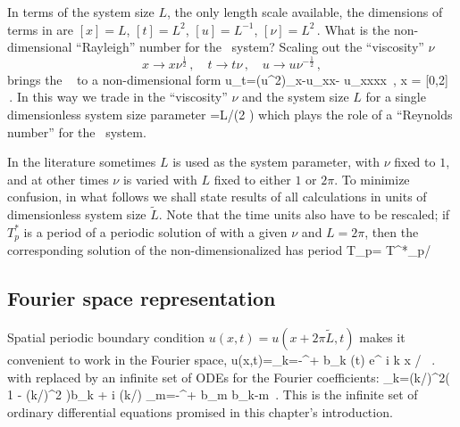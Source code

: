 In terms of the system size $L$, the only length scale available,
the dimensions of terms in  are
$ %
[x]=L
$, $%
[t]=L^2
$, $%
[u]=L^{-1}
$, $%
[\nu]=L^2
\,.
$ %
What is the non-dimensional ``Rayleigh'' number for the
\KS\ system? 
 Scaling out the ``viscosity'' $\nu$ 
\[ 
x \to x \nu^{\frac{1}{2}}
\,,\quad
t \to t \nu
\,,\quad
u \to u \nu^{-\frac{1}{2}}
\,,
\]
brings the \KSe\ 
to a non-dimensional form
\beq
u_t=(u^2)_x-u_{xx}- u_{xxxx}
\,,\qquad	
	x \in  [0,L\nu^{-\frac{1}{2}}] = [0,2\pi{}]
\,.
In this way we trade in the ``viscosity'' $\nu$
and the system size $L$ for a single
dimensionless system size parameter
\beq
	={L}/{(2 \pi \sqrt{\nu})}
which plays the role of a ``Reynolds number''
for the \KS\ system.

In the literature sometimes 
$L$ is used as the system parameter, with $\nu$ fixed to $1$, and
at other times $\nu$ is varied with $L$ fixed to either $1$ or $2\pi$.
To minimize confusion,
in what follows we shall state results of all 
calculations in units of dimensionless system size $\tilde{L}$.
Note that the time units also have to be
rescaled; if $T^*_p$ is a period
of a periodic solution of  with a given
$\nu$ and $L=2\pi$, then
the corresponding solution of the non-dimensionalized 
has period 
\beq
 T_p= T^*_p/\nu
{}


\subsection{Fourier space representation} \label{s:FourierModes}


%
\noindent
Spatial periodic boundary condition $u(x,t)=u(x+2\pi\tilde{L},t)$
makes it convenient to work in the Fourier space, 
\beq
  u(x,t)=\sum_{k=-\infty}^{+\infty} b_k (t) e^{ i k x / }
\, .
with  replaced by an infinite set of 
ODEs for the Fourier coefficients:
\beq
_k=(k/)^2\left( 1 - (k/)^2  \right)b_k 
 	 + i (k/) \sum_{m=-\infty}^{+\infty} b_m b_{k-m}
\,.
%
This is the infinite set of ordinary differential equations promised
in this chapter's introduction. 
%

